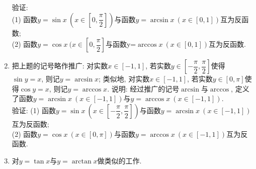 \documentclass[10pt,a4paper]{article}
\begin{document}
\begin{enumerate}[1.]
验证:\\
(1) 函数$y=\sin x\ (x\in [0, \dfrac\pi 2])$与函数$y=\arcsin x \ (x\in [0, 1])$互为反函数;\\
(2) 函数$y=\cos x \ (x\in [0, \dfrac \pi 2]$与函数y=$\arccos x\ (x\in [0, 1])$互为反函数.
\vspace*{3cm}
\item 把上题的记号略作推广: 对实数$x\in [-1, 1]$, 若实数$y\in [-\dfrac \pi 2, \dfrac\pi 2]$使得$\sin y=x$, 则记$y=\arcsin x$; 类似地, 对实数$x\in [-1, 1]$, 若实数$y\in [0, \pi]$使得$\cos y=x$, 则记$y=\arccos x$. 说明: 经过推广的记号$\arcsin$与$\arccos$, 定义了函数$y=\arcsin x \ (x\in [-1, 1])$与$y=\arccos x \ (x\in [-1, 1])$.\\
验证:
(1) 函数$y=\sin x \ (x\in  [-\dfrac\pi 2, \dfrac\pi 2])$与函数$y=\arcsin x \ (x\in [-1, 1])$互为反函数;\\
(2) 函数$y=\cos x\ (x\in [0, \pi])$与函数$y=\arccos x \ (x\in [-1, 1])$互为反函数.
\vspace*{3cm}
\item 对$y=\tan x$与$y=\arctan x$做类似的工作.
\vspace*{3cm}
\end{enumerate}
\end{document}
